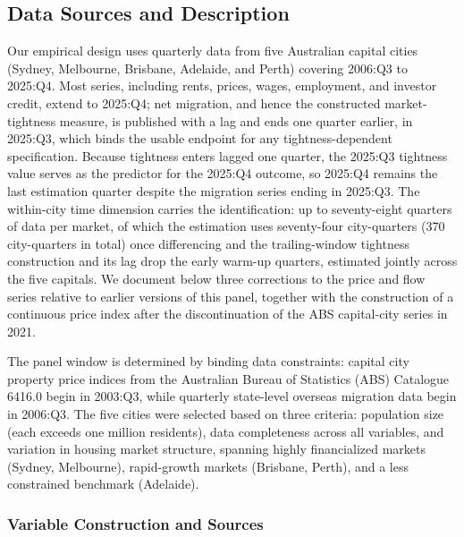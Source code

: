 \documentclass[preprint,11pt,authoryear]{elsarticle}
\begin{document}
\subsection{Data Sources and Description}
\label{sec:data}

Our empirical design uses quarterly data from five Australian capital
cities (Sydney, Melbourne, Brisbane, Adelaide, and Perth) covering
2006:Q3 to 2025:Q4. Most series, including rents, prices, wages,
employment, and investor credit, extend to 2025:Q4; net migration, and
hence the constructed market-tightness measure, is published with a lag
and ends one quarter earlier, in 2025:Q3, which binds the usable endpoint
for any tightness-dependent specification. Because tightness enters lagged
one quarter, the 2025:Q3 tightness value serves as the predictor for the
2025:Q4 outcome, so 2025:Q4 remains the last estimation quarter despite the
migration series ending in 2025:Q3. The within-city time dimension
carries the identification: up to seventy-eight quarters of data per
market, of which the estimation uses seventy-four city-quarters
(370 city-quarters in total) once differencing and the trailing-window
tightness construction and its lag drop the early warm-up quarters,
estimated jointly across the five capitals. We document below three
corrections to the price and flow series relative to earlier versions of
this panel, together with the construction of a continuous price index
after the discontinuation of the ABS capital-city series in 2021.

The panel window is determined by binding data constraints: capital city
property price indices from the Australian Bureau of Statistics (ABS)
Catalogue 6416.0 begin in 2003:Q3, while quarterly state-level overseas
migration data begin in 2006:Q3. The five cities were selected based
on three criteria: population size (each exceeds one million
residents), data completeness across all variables, and variation in
housing market structure, spanning highly financialized markets
(Sydney, Melbourne), rapid-growth markets (Brisbane, Perth), and a
less constrained benchmark (Adelaide).
\subsubsection{Variable Construction and Sources}
\end{document}
